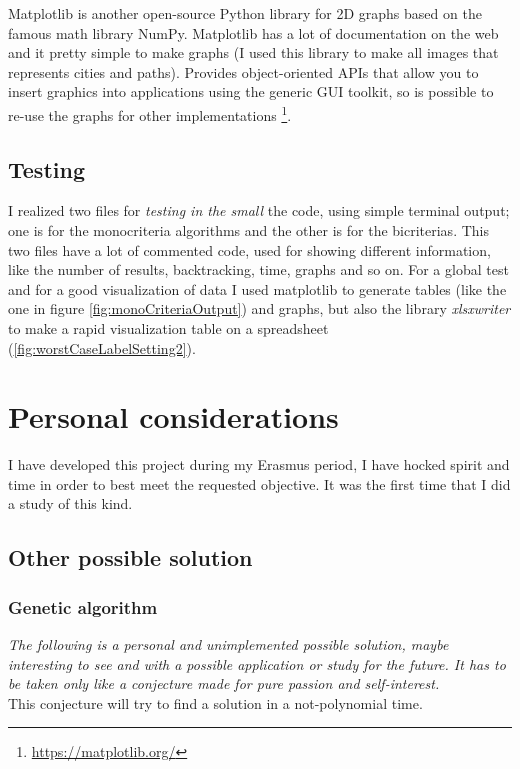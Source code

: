 \documentclass[a4paper,11pt]{report}
\begin{document}
Matplotlib is another open-source Python library for 2D graphs based on the famous math library NumPy. Matplotlib has a lot of documentation on the web and it pretty simple to make graphs (I used this library to make all images that represents cities and paths).
Provides object-oriented APIs that allow you to insert graphics into applications using the generic GUI toolkit, so is possible to re-use the graphs for other implementations \footnote{\url{https://matplotlib.org/}}.
\section{Testing}
I realized two files for \textit{testing in the small} the code, using simple terminal output; one is for the monocriteria algorithms and the other is for the bicriterias. This two files have a lot of commented code, used for showing different information, like the number of results, backtracking, time, graphs and so on. For a global test and for a good visualization of data I used matplotlib to generate tables (like the one in figure \ref{fig:monoCriteriaOutput}) and graphs, but also the library \textit{xlsxwriter} to make a rapid visualization table on a spreadsheet (\ref{fig:worstCaseLabelSetting2}).

\chapter{Personal considerations}
I have developed this project during my Erasmus period, I have hocked spirit and time in order to best meet the requested objective. It was the first time that I did a study of this kind.

\section{Other possible solution}
\subsection*{Genetic algorithm}
\textit{The following is a personal and unimplemented possible solution, maybe interesting to see and with a possible application or study for the future.
It has to be taken only like a conjecture made for pure passion and self-interest.}
\vspace{10mm}\\
This conjecture will try to find a solution in a not-polynomial time.
\end{document}
